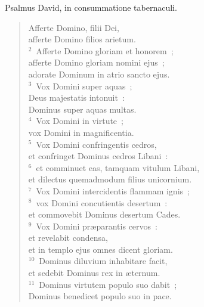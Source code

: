 \lettrine[lines=3,image=true,loversize=0.05,lraise=-0.03]{P}{}salmus David, in consummatione tabernaculi. \begin{flushleft}\begin{verse}\vspace{6pt}Afferte Domino, filii Dei,\\ afferte Domino filios arietum.\\
${}^{2}$~Afferte Domino gloriam et honorem~;\\ afferte Domino gloriam nomini ejus~;\\ adorate Dominum in atrio sancto ejus.\\
${}^{3}$~Vox Domini super aquas~;\\ Deus majestatis intonuit~:\\ Dominus super aquas multas.\\
${}^{4}$~Vox Domini in virtute~;\\ vox Domini in magnificentia.\\
${}^{5}$~Vox Domini confringentis cedros,\\ et confringet Dominus cedros Libani~:\\
${}^{6}$~et comminuet eas, tamquam vitulum Libani,\\ et dilectus quemadmodum filius unicornium.\\
${}^{7}$~Vox Domini intercidentis flammam ignis~;\\
${}^{8}$~vox Domini concutientis desertum~:\\ et commovebit Dominus desertum Cades.\\
${}^{9}$~Vox Domini pr\ae parantis cervos~:\\ et revelabit condensa,\\ et in templo ejus omnes dicent gloriam.\\
${}^{10}$~Dominus diluvium inhabitare facit,\\ et sedebit Dominus rex in \ae ternum.\\
${}^{11}$~Dominus virtutem populo suo dabit~;\\ Dominus benedicet populo suo in pace.\end{verse}\end{flushleft}



